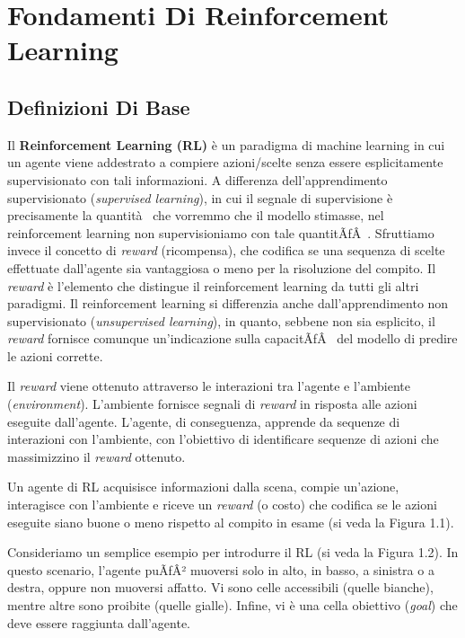 ﻿\documentclass[11pt, a4paper]{report}
\author{Francesco Lo Verde}
\begin{document}
\section{Fondamenti Di Reinforcement Learning}

\subsection{Definizioni Di Base}

Il \textbf{Reinforcement Learning (RL)} è un paradigma di machine learning in cui un agente viene addestrato a compiere azioni/scelte senza essere esplicitamente supervisionato con tali informazioni. A differenza dell'apprendimento supervisionato (\emph{supervised learning}), in cui il segnale di supervisione è precisamente la quantità  che vorremmo che il modello stimasse, nel reinforcement learning non supervisioniamo con tale quantitÃƒÂ . Sfruttiamo invece il concetto di \emph{reward} (ricompensa), che codifica se una sequenza di scelte effettuate dall'agente sia vantaggiosa o meno per la risoluzione del compito. Il \emph{reward} è l'elemento che distingue il reinforcement learning da tutti gli altri paradigmi. Il reinforcement learning si differenzia anche dall'apprendimento non supervisionato (\emph{unsupervised learning}), in quanto, sebbene non sia esplicito, il \emph{reward} fornisce comunque un'indicazione sulla capacitÃƒÂ  del modello di predire le azioni corrette.

Il \emph{reward} viene ottenuto attraverso le interazioni tra l'agente e l'ambiente (\emph{environment}). L'ambiente fornisce segnali di \emph{reward} in risposta alle azioni eseguite dall'agente. L'agente, di conseguenza, apprende da sequenze di interazioni con l'ambiente, con l'obiettivo di identificare sequenze di azioni che massimizzino il \emph{reward} ottenuto.

Un agente di RL acquisisce informazioni dalla scena, compie un'azione, interagisce con l'ambiente e riceve un \emph{reward} (o costo) che codifica se le azioni eseguite siano buone o meno rispetto al compito in esame (si veda la Figura 1.1).

Consideriamo un semplice esempio per introdurre il RL (si veda la Figura 1.2). In questo scenario, l'agente puÃƒÂ² muoversi solo in alto, in basso, a sinistra o a destra, oppure non muoversi affatto. Vi sono celle accessibili (quelle bianche), mentre altre sono proibite (quelle gialle). Infine, vi è una cella obiettivo (\emph{goal}) che deve essere raggiunta dall'agente.
\end{document}
